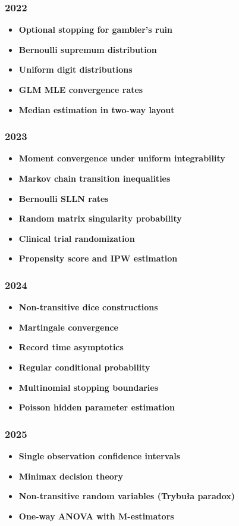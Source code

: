 \subsubsection*{2022}
\begin{itemize}
    \item \textbf{Optional stopping for gambler's ruin}
    \item \textbf{Bernoulli supremum distribution}
    \item \textbf{Uniform digit distributions}
    \item \textbf{GLM MLE convergence rates}
    \item \textbf{Median estimation in two-way layout}
\end{itemize}

\subsubsection*{2023}
\begin{itemize}
    \item \textbf{Moment convergence under uniform integrability}
    \item \textbf{Markov chain transition inequalities}
    \item \textbf{Bernoulli SLLN rates}
    \item \textbf{Random matrix singularity probability}
    \item \textbf{Clinical trial randomization}
    \item \textbf{Propensity score and IPW estimation}
\end{itemize}

\subsubsection*{2024}
\begin{itemize}
    \item \textbf{Non-transitive dice constructions}
    \item \textbf{Martingale convergence}
    \item \textbf{Record time asymptotics}
    \item \textbf{Regular conditional probability}
    \item \textbf{Multinomial stopping boundaries}
    \item \textbf{Poisson hidden parameter estimation}
\end{itemize}

\subsubsection*{2025}
\begin{itemize}
    \item \textbf{Single observation confidence intervals}
    \item \textbf{Minimax decision theory}
    \item \textbf{Non-transitive random variables (Trybu\l a paradox)}
    \item \textbf{One-way ANOVA with M-estimators}
\end{itemize}

